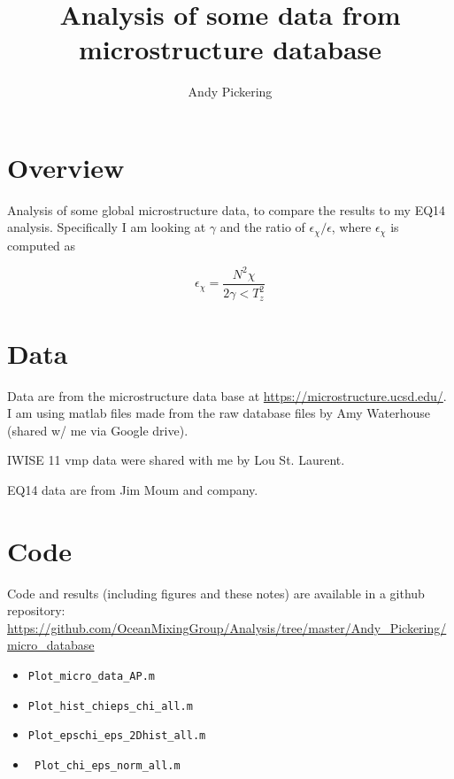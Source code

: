 \documentclass[11pt]{article}
\title{Analysis of some data from microstructure database}
\author{Andy Pickering}
\begin{document}
\maketitle

\tableofcontents
\newpage

\section{Overview}

Analysis of some global microstructure data, to compare the results to my EQ14 analysis. Specifically I am looking at $\gamma$ and the ratio of $\epsilon_{\chi}/\epsilon$, where $\epsilon_{\chi}$ is computed as 

\begin{equation}
\epsilon_{\chi} = \frac{N^2\chi}{2\gamma<T_{z}^{2}}
\end{equation}


\section{Data}

Data are from the microstructure data base at \url{https://microstructure.ucsd.edu/}. I am using matlab files made from the raw database files by Amy Waterhouse (shared w/ me via Google drive). 

IWISE 11 vmp data were shared with me by Lou St. Laurent.

EQ14 data are from Jim Moum and company.

\section{Code}

Code and results (including figures and these notes) are available in a github repository: \url{https://github.com/OceanMixingGroup/Analysis/tree/master/Andy_Pickering/micro_database}

\begin{itemize}

\item \verb+Plot_micro_data_AP.m+

\item \verb+Plot_hist_chieps_chi_all.m+

\item \verb+Plot_epschi_eps_2Dhist_all.m+

\item \verb+ Plot_chi_eps_norm_all.m+

\end{itemize}
\end{document}
